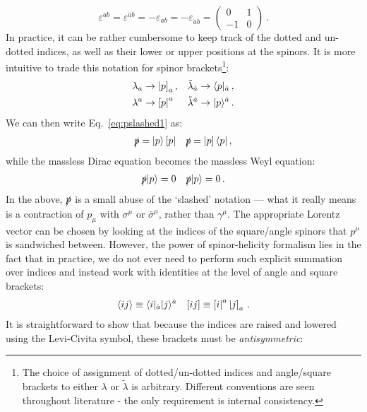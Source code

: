 \documentclass[main.tex]{subfiles}
\begin{document}
\begin{equation}
    \varepsilon^{ab} = \varepsilon^{\dot{a}\dot{b}} = -\varepsilon_{ab} = -\varepsilon_{\dot{a}\dot{b}} = 
    \begin{pmatrix}
        0 & 1 \\
        -1 & 0
    \end{pmatrix}\,.
\end{equation}
In practice, it can be rather cumbersome to keep track of the dotted and un-dotted indices, as well as their lower or upper positions at the spinors. It is more intuitive to trade this notation for spinor brackets\footnote{The choice of assignment of dotted/un-dotted indices and angle/square brackets to either $\lambda$ or $\tilde{\lambda}$ is arbitrary. Different conventions are seen throughout literature - the only requirement is internal consistency.}:
\begin{align} \label{eq:lambdatobraket}
    \lambda_a  &\rightarrow \left| p \right]_a,  &&\tilde{\lambda}_{\dot{a}} \rightarrow \langle p|_{\dot{a}}\,, \nonumber \\
    \lambda^a  &\rightarrow \left[ p \right|^a  &&\tilde{\lambda}^{\dot{a}} \rightarrow |p \rangle^{\dot{a}} \,.
\end{align}
We can then write Eq.~\ref{eq:pslashed1} as:
\begin{align} \label{eq:pslashed2}
    \slashed{p} = |p \rangle\left[ p \right| && \slashed{p} = \left| p \right] \langle p| \,,
\end{align}
while the massless Dirac equation becomes the massless Weyl equation:
\begin{align} \label{eq:weyleq}
    \slashed{p}|p \rangle = 0 && \slashed{p}|p \rangle = 0\,.
\end{align}
In the above, $\slashed{p}$ is a small abuse of the `slashed' notation --- what it really means is a contraction of $p_\mu$ with $\sigma^\mu$ or $\bar{\sigma}^\mu$, rather than $\gamma^\mu$. The appropriate Lorentz vector can be chosen by looking at the indices of the square/angle spinors that $p^\mu$ is sandwiched between. However, the power of spinor-helicity formalism lies in the fact that in practice, we do not ever need to perform such explicit summation over indices and instead work with identities at the level of angle and square brackets:
\begin{align}
    \langle ij \rangle \equiv \langle i|_{\dot{a}} |j \rangle^{\dot{a}}&& [ ij ] \equiv \left[ i \right|^a \left| j \right]_a \,.     
\end{align}
It is straightforward to show that because the indices are raised and lowered using the Levi-Civita symbol, these brackets must be \textit{antisymmetric}:
\end{document}
